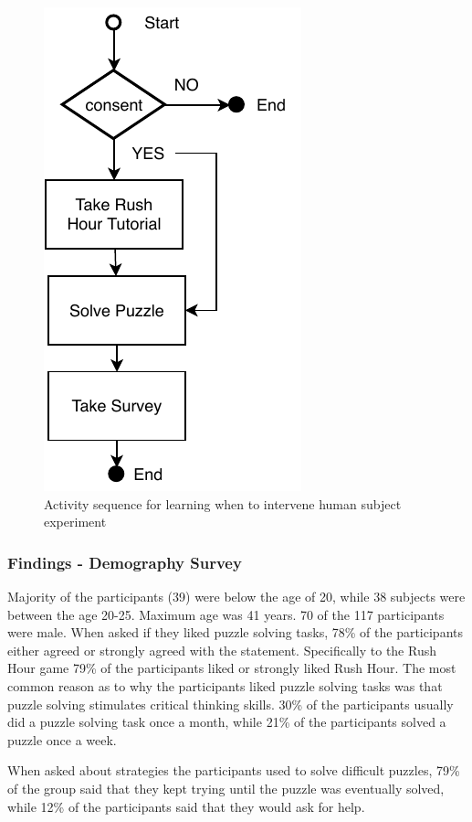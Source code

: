 \begin{figure}[!hbt]
  \centering                                                    
  \includegraphics[keepaspectratio]{img/phase1.pdf}
  \caption{Activity sequence for learning when to intervene human subject experiment}
  \label{fig:phase1}
\end{figure}

\subsubsection*{Findings - Demography Survey}
Majority of the participants (39) were below the age of 20, while 38 subjects were between the age 20-25. Maximum age was 41 years. 70 of the 117 participants were male. When asked if they liked puzzle solving tasks, 78\% of the participants either agreed or strongly agreed with the statement. Specifically to the Rush Hour game 79\% of the participants liked or strongly liked Rush Hour. The most common reason as to why the participants liked puzzle solving tasks was that puzzle solving stimulates critical thinking skills. 30\% of the participants usually did a puzzle solving task once a month, while 21\% of the participants solved a puzzle once a week.

When asked about strategies the participants used to solve difficult puzzles, 79\% of the group said that they kept trying until the puzzle was eventually solved, while 12\% of the participants said that they would ask for help. 

